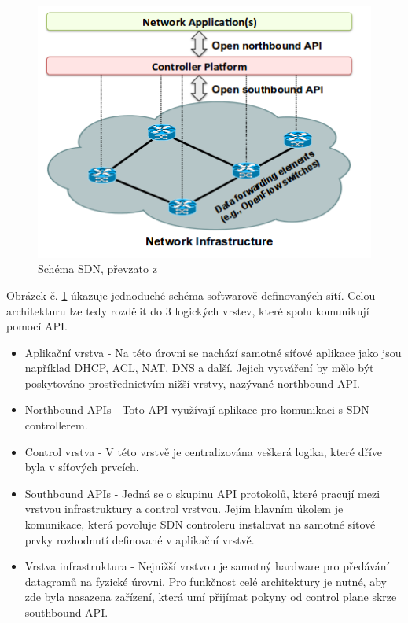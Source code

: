 \begin{figure}[h]
\begin{centering}
\includegraphics[scale=0.60]{images/SDN}
\par\end{centering}
\caption{Schéma SDN, převzato z \cite{SDN_clanek}\label{fig:SDN}}
\end{figure}

Obrázek č. \ref{fig:SDN} úkazuje jednoduché schéma softwarově definovaných sítí. Celou architekturu lze tedy rozdělit do 3 logických vrstev, které spolu komunikují pomocí API. 

\begin{itemize}
\item Aplikační vrstva - Na této úrovni se nachází samotné síťové aplikace jako jsou například DHCP, ACL, NAT, DNS a další. Jejich vytváření by
mělo být poskytováno prostřednictvím nižší vrstvy, nazývané northbound API.
\item Northbound APIs - Toto API využívají aplikace pro komunikaci s SDN controllerem. 
\item Control vrstva - V této vrstvě je centralizována veškerá logika, které dříve byla v síťových prvcích.
\item Southbound APIs - Jedná se o skupinu API protokolů, které pracují mezi vrstvou infrastruktury a control vrstvou. Jejím hlavním úkolem je komunikace, která povoluje SDN controleru instalovat na samotné síťové prvky rozhodnutí definované v aplikační vrstvě.
\item Vrstva infrastruktura - Nejnižší vrstvou je samotný hardware pro předávání datagramů na fyzické úrovni. Pro funkčnost celé architektury je nutné, aby zde byla nasazena zařízení, která umí přijímat pokyny od control plane skrze southbound API.

\end{itemize}

